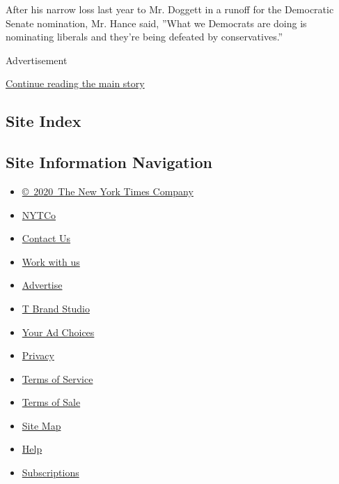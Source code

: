 After his narrow loss last year to Mr. Doggett in a runoff for the
Democratic Senate nomination, Mr. Hance said, ''What we Democrats are
doing is nominating liberals and they're being defeated by
conservatives.''

Advertisement

\protect\hyperlink{after-bottom}{Continue reading the main story}

\hypertarget{site-index}{%
\subsection{Site Index}\label{site-index}}

\hypertarget{site-information-navigation}{%
\subsection{Site Information
Navigation}\label{site-information-navigation}}

\begin{itemize}
\tightlist
\item
  \href{https://help.nytimes.com/hc/en-us/articles/115014792127-Copyright-notice}{©~2020~The
  New York Times Company}
\end{itemize}

\begin{itemize}
\tightlist
\item
  \href{https://www.nytco.com/}{NYTCo}
\item
  \href{https://help.nytimes.com/hc/en-us/articles/115015385887-Contact-Us}{Contact
  Us}
\item
  \href{https://www.nytco.com/careers/}{Work with us}
\item
  \href{https://nytmediakit.com/}{Advertise}
\item
  \href{http://www.tbrandstudio.com/}{T Brand Studio}
\item
  \href{https://www.nytimes.com/privacy/cookie-policy\#how-do-i-manage-trackers}{Your
  Ad Choices}
\item
  \href{https://www.nytimes.com/privacy}{Privacy}
\item
  \href{https://help.nytimes.com/hc/en-us/articles/115014893428-Terms-of-service}{Terms
  of Service}
\item
  \href{https://help.nytimes.com/hc/en-us/articles/115014893968-Terms-of-sale}{Terms
  of Sale}
\item
  \href{https://spiderbites.nytimes.com}{Site Map}
\item
  \href{https://help.nytimes.com/hc/en-us}{Help}
\item
  \href{https://www.nytimes.com/subscription?campaignId=37WXW}{Subscriptions}
\end{itemize}
